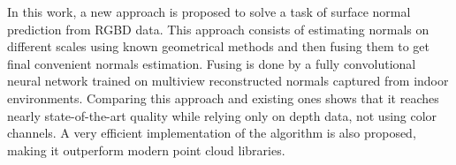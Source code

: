 In this work, a new approach is proposed to solve a task of surface normal prediction from RGBD data. This approach consists of estimating normals on different scales using known geometrical methods and then fusing them to get final convenient normals estimation. Fusing is done by a fully convolutional neural network trained on multiview reconstructed normals captured from indoor environments. Comparing this approach and existing ones shows that it reaches nearly state-of-the-art quality while relying only on depth data, not using color channels. A very efficient implementation of the algorithm is also proposed, making it outperform modern point cloud libraries.